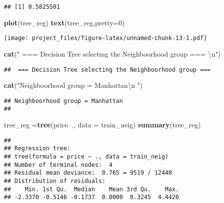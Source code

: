 \documentclass[
]{article}
\newenvironment{Shaded}{\begin{snugshade}}{\end{snugshade}}
\newcommand{\CharTok}[1]{\textcolor[rgb]{0.31,0.60,0.02}{#1}}
\newcommand{\DataTypeTok}[1]{\textcolor[rgb]{0.13,0.29,0.53}{#1}}
\newcommand{\DecValTok}[1]{\textcolor[rgb]{0.00,0.00,0.81}{#1}}
\newcommand{\KeywordTok}[1]{\textcolor[rgb]{0.13,0.29,0.53}{\textbf{#1}}}
\newcommand{\NormalTok}[1]{#1}
\newcommand{\OperatorTok}[1]{\textcolor[rgb]{0.81,0.36,0.00}{\textbf{#1}}}
\newcommand{\StringTok}[1]{\textcolor[rgb]{0.31,0.60,0.02}{#1}}
\begin{document}
\begin{verbatim}
## [1] 0.5825501
\end{verbatim}

\begin{Shaded}
\begin{Highlighting}[]
\KeywordTok{plot}\NormalTok{(tree_reg)}
\KeywordTok{text}\NormalTok{(tree_reg,}\DataTypeTok{pretty=}\DecValTok{0}\NormalTok{)}
\end{Highlighting}
\end{Shaded}

\texttt{[image: project\_files/figure-latex/unnamed-chunk-13-1.pdf]}

\begin{Shaded}
\begin{Highlighting}[]
\KeywordTok{cat}\NormalTok{(}\StringTok{" === Decision Tree selecting the Neighboorhood group === }\CharTok{\textbackslash{}n}\StringTok{"}\NormalTok{)}
\end{Highlighting}
\end{Shaded}

\begin{verbatim}
##  === Decision Tree selecting the Neighboorhood group ===
\end{verbatim}

\begin{Shaded}
\begin{Highlighting}[]
\KeywordTok{cat}\NormalTok{(}\StringTok{"Neighboorhood group = Manhattan}\CharTok{\textbackslash{}n}\StringTok{ "}\NormalTok{)}
\end{Highlighting}
\end{Shaded}

\begin{verbatim}
## Neighboorhood group = Manhattan
## 
\end{verbatim}

\begin{Shaded}
\begin{Highlighting}[]
\NormalTok{tree_reg =}\KeywordTok{tree}\NormalTok{(price}\OperatorTok{~}\NormalTok{., }\DataTypeTok{data =}\NormalTok{ train_neig)}
\KeywordTok{summary}\NormalTok{(tree_reg)}
\end{Highlighting}
\end{Shaded}

\begin{verbatim}
## 
## Regression tree:
## tree(formula = price ~ ., data = train_neig)
## Number of terminal nodes:  4 
## Residual mean deviance:  0.765 = 9519 / 12440 
## Distribution of residuals:
##    Min. 1st Qu.  Median    Mean 3rd Qu.    Max. 
## -2.3370 -0.5146 -0.1737  0.0000  0.3245  4.4420
\end{verbatim}
\end{document}
